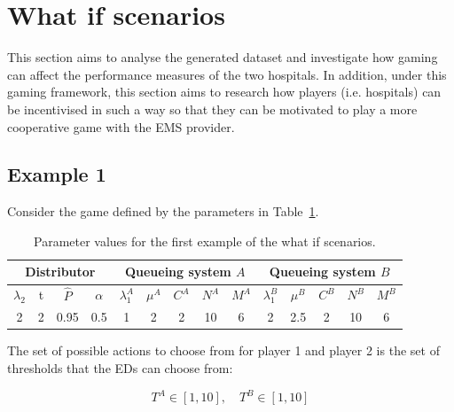 \section{What if scenarios}\label{sec:results_what_if}

This section aims to analyse the generated dataset and investigate how
gaming can affect the performance measures of the two hospitals.
In addition, under this gaming framework, this section aims to research how
players (i.e. hospitals) can be incentivised in such a way so that they can be
motivated to play a more cooperative game with the EMS provider.


\subsection{Example 1}

Consider the game defined by the parameters in
Table~\ref{tab:results_what_if_example_1}.

\begin{table}[H]
    \caption{Parameter values for the first example of the what if scenarios.}
    \begin{center}
        \begin{tabular}{||c|c|c|c||c|c|c|c|c||c|c|c|c|c||}
            \hline
            \multicolumn{4}{||c||}{\textbf{Distributor}} &
            \multicolumn{5}{c||}{\textbf{Queueing system \(A\)}} &
            \multicolumn{5}{c||}{\textbf{Queueing system \(B\)}} \\
            \hline
            \(\lambda_2\) & t & \footnotesize{\(\hat{P}\)} & \(\alpha\) &
            \(\lambda_1^A\) & \(\mu^A\) & \(C^A\) & \(N^A\) & \(M^A\) &
            \(\lambda_1^B\) & \(\mu^B\) & \(C^B\) & \(N^B\) & \(M^B\) \\
            \hline
            2 & 2 & 0.95 & 0.5 & 1 & 2 & 2 & 10 & 6 & 2 & 2.5 & 2 & 10 & 6 \\
            \hline
        \end{tabular}
    \end{center}
    \label{tab:results_what_if_example_1}
\end{table}

The set of possible actions to choose from for player 1 and player 2 is the
set of thresholds that the EDs can choose from: 

\begin{equation}
    T^A \in [1, 10], \quad T^B \in [1, 10]
\end{equation}

